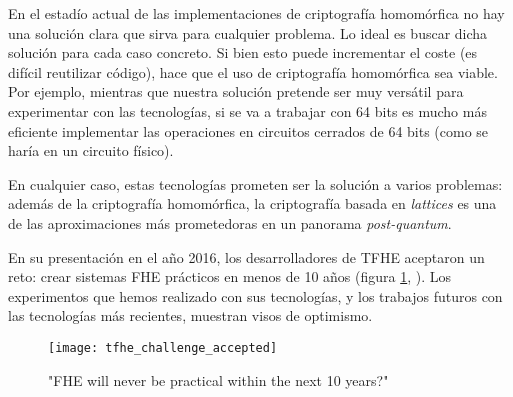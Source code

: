 En el estadío actual de las implementaciones de criptografía homomórfica no hay una solución clara que sirva para cualquier problema. Lo ideal es buscar dicha solución para cada caso concreto. Si bien esto puede incrementar el coste (es difícil reutilizar código), hace que el uso de criptografía homomórfica sea viable. Por ejemplo, mientras que nuestra solución pretende ser muy versátil para experimentar con las tecnologías, si se va a trabajar con 64 bits es mucho más eficiente implementar las operaciones en circuitos cerrados de 64 bits (como se haría en un circuito físico).

En cualquier caso, estas tecnologías prometen ser la solución a varios problemas: además de la criptografía homomórfica, la criptografía basada en \textit{lattices} es una de las aproximaciones más prometedoras en un panorama \textit{post-quantum}.

En su presentación en el año 2016, los desarrolladores de TFHE aceptaron un reto: crear sistemas FHE prácticos en menos de 10 años (figura \ref{fig:tfhe_challenge_accepted}, \cite{chillotti_tfhe:_2016}). Los experimentos que hemos realizado con sus tecnologías, y los trabajos futuros con las tecnologías más recientes, muestran visos de optimismo.

\begin{figure}[h]
    \centering
    \texttt{[image: tfhe\_challenge\_accepted]}
    \caption{"FHE will never be practical within the next 10 years?"}
    \label{fig:tfhe_challenge_accepted}
\end{figure}
 

